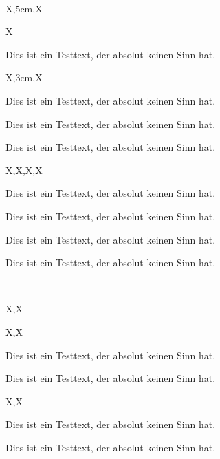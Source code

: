 \documentclass[a3paper,13pt,scifiposter]{tubsposter}
\begin{document}
~
\newpage
\begin{scifiposter}{X,5cm,X}
  \begin{scifirow}{X}
    \begin{scificol}
      Dies ist ein Testtext, der absolut keinen Sinn hat.
    \end{scificol}
  \end{scifirow}
  \begin{scifirow}{X,3cm,X}
    \begin{scificol}
      Dies ist ein Testtext, der absolut keinen Sinn hat.
    \end{scificol}
    \begin{scificol}
      Dies ist ein Testtext, der absolut keinen Sinn hat.
    \end{scificol}
    \begin{scificol}
      Dies ist ein Testtext, der absolut keinen Sinn hat.
    \end{scificol}
  \end{scifirow}
  \begin{scifirow}{X,X,X,X}
    \begin{scificol}
      Dies ist ein Testtext, der absolut keinen Sinn hat.
    \end{scificol}
    \begin{scificol}
      Dies ist ein Testtext, der absolut keinen Sinn hat.
    \end{scificol}
    \begin{scificol}
      Dies ist ein Testtext, der absolut keinen Sinn hat.
    \end{scificol}
    \begin{scificol}
      Dies ist ein Testtext, der absolut keinen Sinn hat.
    \end{scificol}
  \end{scifirow}
\end{scifiposter}
~
\newpage
\begin{scifiposter}{X,X}
  \begin{scifirow}{X,X}
    \begin{scificol}
      Dies ist ein Testtext, der absolut keinen Sinn hat.
    \end{scificol}
    \begin{scificol}
      Dies ist ein Testtext, der absolut keinen Sinn hat.
    \end{scificol}
  \end{scifirow}
  \begin{scifirow}{X,X}
    \begin{scificol}
      Dies ist ein Testtext, der absolut keinen Sinn hat.
    \end{scificol}
    \begin{scificol}
      Dies ist ein Testtext, der absolut keinen Sinn hat.
    \end{scificol}
  \end{scifirow}
\end{scifiposter}
~
\newpage
\end{document}
